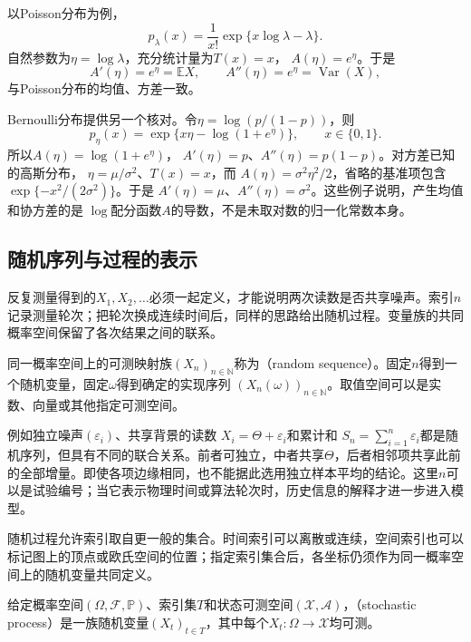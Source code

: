 以Poisson分布为例，
\[ p_\lambda(x)
  =\frac{1}{x!}\exp\{x\log\lambda-\lambda\}. \]
自然参数为\(\eta=\log\lambda\)，充分统计量为\(T(x)=x\)，
\(A(\eta)=e^\eta\)。于是
\[ A'(\eta)=e^\eta=\mathbb{E}X,
  \qquad A''(\eta)=e^\eta=\operatorname{Var}(X), \]
与Poisson分布的均值、方差一致。

Bernoulli分布提供另一个核对。令\(\eta=\log(p/(1-p))\)，则
\[
  p_\eta(x)=\exp\{x\eta-\log(1+e^\eta)\},
  \qquad x\in\{0,1\}.
\]
所以\(A(\eta)=\log(1+e^\eta)\)，
\(A'(\eta)=p\)、\(A''(\eta)=p(1-p)\)。对方差已知的高斯分布，
\(\eta=\mu/\sigma^2\)、\(T(x)=x\)，而
\(A(\eta)=\sigma^2\eta^2/2\)，省略的基准项包含
\(\exp\{-x^2/(2\sigma^2)\}\)。于是
\(A'(\eta)=\mu\)、\(A''(\eta)=\sigma^2\)。这些例子说明，产生均值和协方差的是
\(\log\)配分函数\(A\)的导数，不是未取对数的归一化常数本身。

\subsection{随机序列与过程的表示}
\label{sec:rv-sequences-processes}
\label{sec:stoch-process-joint-laws}
\label{sec:rv-sequences}

反复测量得到的\(X_1,X_2,\ldots\)必须一起定义，才能说明两次读数是否共享噪声。索引\(n\)记录测量轮次；把轮次换成连续时间后，同样的思路给出随机过程。变量族的共同概率空间保留了各次结果之间的联系。
\begin{definition}[随机序列]
\label{def:rv-random-sequence}
同一概率空间上的可测映射族\((X_n)_{n\in\mathbb N}\)称为（random sequence）。固定\(n\)得到一个随机变量，固定\(\omega\)得到确定的实现序列
\((X_n(\omega))_{n\in\mathbb N}\)。取值空间可以是实数、向量或其他指定可测空间。
\end{definition}
例如独立噪声\((\varepsilon_i)\)、共享背景的读数
\(X_i=\Theta+\varepsilon_i\)和累计和
\(S_n=\sum_{i=1}^n\varepsilon_i\)都是随机序列，但具有不同的联合关系。前者可独立，中者共享\(\Theta\)，后者相邻项共享此前的全部增量。即使各项边缘相同，也不能据此选用独立样本平均的结论。这里\(n\)可以是试验编号；当它表示物理时间或算法轮次时，历史信息的解释才进一步进入模型。

\label{sec:rv-paths}
随机过程允许索引取自更一般的集合。时间索引可以离散或连续，空间索引也可以标记图上的顶点或欧氏空间的位置；指定索引集合后，各坐标仍须作为同一概率空间上的随机变量共同定义。
\begin{definition}[随机过程]
  \label{def:stoch-process}
  给定概率空间\((\Omega,\mathcal F,\mathbb P)\)、索引集\(T\)和状态可测空间\((\mathcal X,\mathcal A)\)，（stochastic process）是一族随机变量\((X_t)_{t\in T}\)，其中每个\(X_t:\Omega\to\mathcal X\)均可测。
\end{definition}

